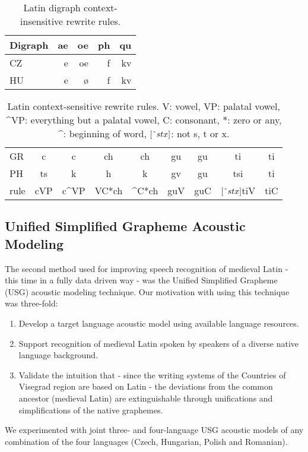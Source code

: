 \documentclass[runningheads,a4paper]{llncs}
\begin{document}
\begin{table}
	\centering
	\caption{Latin digraph context-insensitive rewrite rules.}\label{tbl:digraph}
	\begin{tabular}{l|rrrr}
	\hline
	Digraph & ae & oe & ph & qu \\
	\hline
	CZ & e & oe & f & kv \\
	HU & e & \o & f & kv \\
	\hline
	\end{tabular}
\end{table}

\begin{table}
	\centering
	\caption{Latin context-sensitive rewrite rules. V: vowel, VP: palatal vowel, \string^VP: everything but a palatal vowel, C: consonant, $*$: zero or any, \string^: beginning of word, $[\string^stx]$: not s, t or x.}\label{tbl:context}
	\begin{tabular}{l|cc|cc|cc|cc}
	\hline
	GR & c & c & ch & ch & gu & gu & ti & ti \\
	PH & ts & k & h & k & gv & gu & tsi & ti \\
	\hline
	rule & \multicolumn{1}{c|}{cVP} & \multicolumn{1}{c|}{c\string^VP} & \multicolumn{1}{c|}{VC*ch} & \multicolumn{1}{c|}{\string^C*ch} & \multicolumn{1}{c|}{guV} & \multicolumn{1}{c|}{guC} & \multicolumn{1}{c|}{$[\string^stx]$tiV} & \multicolumn{1}{c|}{tiC} \\
	\hline
	\end{tabular}
\end{table}

\subsection{Unified Simplified Grapheme Acoustic Modeling}\label{usg}
The second method used for improving speech recognition of medieval Latin - this time in a fully data driven way - was the Unified Simplified Grapheme (USG) acoustic modeling technique.
Our motivation with using this technique was three-fold:
\begin{enumerate}
\item Develop a target language acoustic model using available language resources.
\item Support recognition of medieval Latin spoken by speakers of a diverse native language background.
\item Validate the intuition that - since the writing systems of the Countries of Visegrad region are based on Latin - the deviations from the common ancestor (medieval Latin) are extinguishable through unifications and simplifications of the native graphemes.
\end{enumerate}
We experimented with joint three- and four-language USG acoustic models of any combination of the four languages (Czech, Hungarian, Polish and Romanian). 
\end{document}
